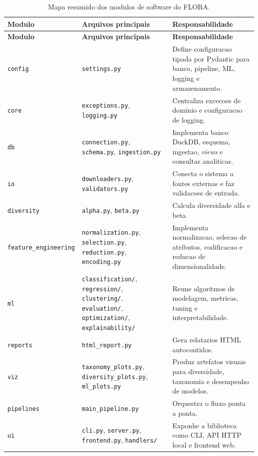 \documentclass[12pt,a4paper]{article}
\begin{document}
\begin{longtable}{>{\raggedright\arraybackslash}p{3.1cm} >{\raggedright\arraybackslash}p{4.0cm} >{\raggedright\arraybackslash}p{6.8cm}}
    \caption{Mapa resumido dos modulos de software do FLORA.}
    \label{tab:modulos_flora}\\
    \toprule
    \textbf{Modulo} & \textbf{Arquivos principais} & \textbf{Responsabilidade} \\
    \midrule
    \endfirsthead
    \toprule
    \textbf{Modulo} & \textbf{Arquivos principais} & \textbf{Responsabilidade} \\
    \midrule
    \endhead
    \texttt{config} & \texttt{settings.py} & Define configuracao tipada por Pydantic para banco, pipeline, ML, logging e armazenamento. \\
    \texttt{core} & \texttt{exceptions.py}, \texttt{logging.py} & Centraliza excecoes de dominio e configuracao de logging. \\
    \texttt{db} & \texttt{connection.py}, \texttt{schema.py}, \texttt{ingestion.py} & Implementa banco DuckDB, esquema, ingestao, \textit{views} e consultas analiticas. \\
    \texttt{io} & \texttt{downloaders.py}, \texttt{validators.py} & Conecta o sistema a fontes externas e faz validacoes de entrada. \\
    \texttt{diversity} & \texttt{alpha.py}, \texttt{beta.py} & Calcula diversidade alfa e beta. \\
    \texttt{feature\_engineering} & \texttt{normalization.py}, \texttt{selection.py}, \texttt{reduction.py}, \texttt{encoding.py} & Implementa normalizacao, selecao de atributos, codificacao e reducao de dimensionalidade. \\
    \texttt{ml} & \texttt{classification/}, \texttt{regression/}, \texttt{clustering/}, \texttt{evaluation/}, \texttt{optimization/}, \texttt{explainability/} & Reune algoritmos de modelagem, metricas, tuning e interpretabilidade. \\
    \texttt{reports} & \texttt{html\_report.py} & Gera relatarios HTML autocontidos. \\
    \texttt{viz} & \texttt{taxonomy\_plots.py}, \texttt{diversity\_plots.py}, \texttt{ml\_plots.py} & Produz artefatos visuais para diversidade, taxonomia e desempenho de modelos. \\
    \texttt{pipelines} & \texttt{main\_pipeline.py} & Orquestra o fluxo ponta a ponta. \\
    \texttt{ui} & \texttt{cli.py}, \texttt{server.py}, \texttt{frontend.py}, \texttt{handlers/} & Exponhe a biblioteca como CLI, API HTTP local e frontend web. \\
    \bottomrule
\end{longtable}
\end{document}
